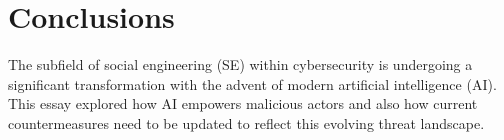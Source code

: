 



\chapter{Conclusions\label{chapter:conclusions}}

\begin{comment}

Guides:
    - As many pages as it takes (thesis max is around 20 pages)

TODO:
    [ ] How AI has augmented SE attacks and countermeasures
    [ ] Gap in the literature

What to cover:
    - How AI has augmented SE attacks and countermeasures
    - Gap in the literature regarding SE and AI intersection?
    - Analysis on where AI-powered SE attacks might be headed in the future
        - Also about robotics and human-like actors
    - What organizations and individuals need to do regarding the evolving landscape of SE attacks

Speculation:
    - Drones dropping USB thumbdrives?
    - Human-like android as threat actors
    - Impact of robotics on dumpster diving, shoulder surfing and baiting
    
Literature:
    - Gen and detection of deepfakes

From training material:
    - Yhteenveto vaatimattomimmillaan on vain lyhyt kertaus kirjoituksen keskeisistä asioista. Arvokkaamman yhteenvedon saa aikaan kommentoimalla työn tulosten arvoa, työn liittymistä ympäristöön ja tulevaisuudennäkymiä. Tällaiset arviot huolellisesti perusteltava.

\end{comment}

The subfield of social engineering (SE) within cybersecurity is undergoing a significant transformation with the advent of modern artificial intelligence (AI). This essay explored how AI empowers malicious actors and also how current countermeasures need to be updated to reflect this evolving threat landscape.





